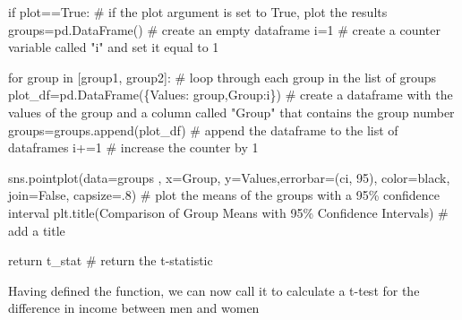 \documentclass[
  letterpaper,
  DIV=11,
  numbers=noendperiod]{scrreprt}
\newenvironment{Shaded}{\begin{snugshade}}{\end{snugshade}}
\newcommand{\CommentTok}[1]{\textcolor[rgb]{0.37,0.37,0.37}{#1}}
\newcommand{\ControlFlowTok}[1]{\textcolor[rgb]{0.00,0.23,0.31}{#1}}
\newcommand{\DecValTok}[1]{\textcolor[rgb]{0.68,0.00,0.00}{#1}}
\newcommand{\FloatTok}[1]{\textcolor[rgb]{0.68,0.00,0.00}{#1}}
\newcommand{\KeywordTok}[1]{\textcolor[rgb]{0.00,0.23,0.31}{#1}}
\newcommand{\NormalTok}[1]{\textcolor[rgb]{0.00,0.23,0.31}{#1}}
\newcommand{\OperatorTok}[1]{\textcolor[rgb]{0.37,0.37,0.37}{#1}}
\newcommand{\StringTok}[1]{\textcolor[rgb]{0.13,0.47,0.30}{#1}}
\newcommand{\VariableTok}[1]{\textcolor[rgb]{0.07,0.07,0.07}{#1}}
\begin{document}
\begin{Shaded}
\begin{Highlighting}[]
    \ControlFlowTok{if}\NormalTok{ plot}\OperatorTok{==}\VariableTok{True}\NormalTok{: }\CommentTok{\# if the plot argument is set to True, plot the results}
\NormalTok{        groups}\OperatorTok{=}\NormalTok{pd.DataFrame() }\CommentTok{\# create an empty dataframe}
\NormalTok{        i}\OperatorTok{=}\DecValTok{1} \CommentTok{\# create a counter variable called "i" and set it equal to 1}
        
        \ControlFlowTok{for}\NormalTok{ group }\KeywordTok{in}\NormalTok{ [group1, group2]: }\CommentTok{\# loop through each group in the list of groups}
\NormalTok{            plot\_df}\OperatorTok{=}\NormalTok{pd.DataFrame(\{}\StringTok{\textquotesingle{}Values\textquotesingle{}}\NormalTok{: group,}\StringTok{\textquotesingle{}Group\textquotesingle{}}\NormalTok{:i\}) }\CommentTok{\# create a dataframe with the values of the group and a column called "Group" that contains the group number}
\NormalTok{            groups}\OperatorTok{=}\NormalTok{groups.append(plot\_df) }\CommentTok{\# append the dataframe to the list of dataframes}
\NormalTok{            i}\OperatorTok{+=}\DecValTok{1} \CommentTok{\# increase the counter by 1}
        
\NormalTok{        sns.pointplot(data}\OperatorTok{=}\NormalTok{groups , x}\OperatorTok{=}\StringTok{\textquotesingle{}Group\textquotesingle{}}\NormalTok{, y}\OperatorTok{=}\StringTok{\textquotesingle{}Values\textquotesingle{}}\NormalTok{,errorbar}\OperatorTok{=}\NormalTok{(}\StringTok{\textquotesingle{}ci\textquotesingle{}}\NormalTok{, }\DecValTok{95}\NormalTok{), color}\OperatorTok{=}\StringTok{\textquotesingle{}black\textquotesingle{}}\NormalTok{, join}\OperatorTok{=}\VariableTok{False}\NormalTok{, capsize}\OperatorTok{=}\FloatTok{.8}\NormalTok{) }\CommentTok{\# plot the means of the groups with a 95\% confidence interval}
\NormalTok{        plt.title(}\StringTok{\textquotesingle{}Comparison of Group Means with 95\% Confidence Intervals\textquotesingle{}}\NormalTok{) }\CommentTok{\# add a title}
    
    \ControlFlowTok{return}\NormalTok{ t\_stat }\CommentTok{\# return the t{-}statistic}
\end{Highlighting}
\end{Shaded}

Having defined the function, we can now call it to calculate a t-test
for the difference in income between men and women
\end{document}

